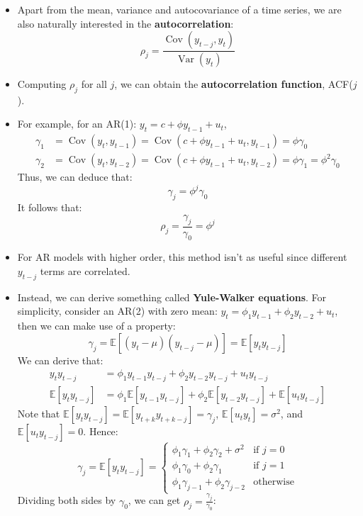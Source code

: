 \documentclass[notitlepage]{article}
\DeclareMathOperator{\Var}{Var}
\DeclareMathOperator{\Cov}{Cov}
\begin{document}
\begin{itemize}
    \item Apart from the mean, variance and autocovariance of a time series, we are also naturally interested in the \textbf{autocorrelation}:
    \[
    \rho_j = \frac{\Cov(y_{t-j}, y_t)}{\Var(y_t)}
    \]
    \item Computing \(\rho_j\) for all \(j\), we can obtain the \textbf{autocorrelation function}, ACF(\(j\)).
    \item For example, for an AR(1): \(y_t = c + \phi y_{t-1} + u_t\),
    \begin{align*}
        \gamma_1 &= \Cov(y_t, y_{t-1}) = \Cov(c + \phi y_{t-1} + u_t, y_{t-1}) = \phi \gamma_0 \\
        \gamma_2 &= \Cov(y_t, y_{t-2}) = \Cov(c + \phi y_{t-1} + u_t, y_{t-2}) = \phi \gamma_1 = \phi^2\gamma_0
    \end{align*}
    Thus, we can deduce that:
    \[
    \gamma_j = \phi^j \gamma_0
    \]
    It follows that:
    \[
    \rho_j = \frac{\gamma_j}{\gamma_0} = \phi^j
    \]
    \item For AR models with higher order, this method isn't as useful since different \(y_{t-j}\) terms are correlated.
    \item Instead, we can derive something called \textbf{Yule-Walker equations}. For simplicity, consider an AR(2) with zero mean: \(y_t = \phi_1 y_{t-1} + \phi_2 y_{t-2} + u_t\), then we can make use of a property:
    \[
    \gamma_j = \mathbb{E}[(y_t-\mu)(y_{t-j}-\mu)] = \mathbb{E}[y_ty_{t-j}]
    \]
    We can derive that:
    \begin{align*}
        y_ty_{t-j} &= \phi_1 y_{t-1}y_{t-j} + \phi_2 y_{t-2}y_{t-j} + u_ty_{t-j} \\
        \mathbb{E}[y_ty_{t-j}] &= \phi_1 \mathbb{E}[y_{t-1}y_{t-j}] + \phi_2 \mathbb{E}[y_{t-2}y_{t-j}] + \mathbb{E}[u_ty_{t-j}]
    \end{align*}
    Note that \(\mathbb{E}[y_ty_{t-j}] = \mathbb{E}[y_{t+k}y_{t+k-j}] = \gamma_j\), \(\mathbb{E}[u_ty_t] = \sigma^2\), and \(\mathbb{E}[u_ty_{t-j}] = 0\). Hence:
    \[
    \gamma_j = \mathbb{E}[y_ty_{t-j}] =
    \begin{cases}
        \phi_1 \gamma_1 + \phi_2 \gamma_2 + \sigma^2 &\text{if } j=0 \\
        \phi_1 \gamma_0 + \phi_2 \gamma_1 &\text{if } j=1 \\
        \phi_1 \gamma_{j-1} + \phi_2 \gamma_{j-2} &\text{otherwise}
    \end{cases}
    \]
    Dividing both sides by \(\gamma_0\), we can get \(\rho_j = \frac{\gamma_j}{\gamma_0}\):

\end{itemize}
\end{document}
